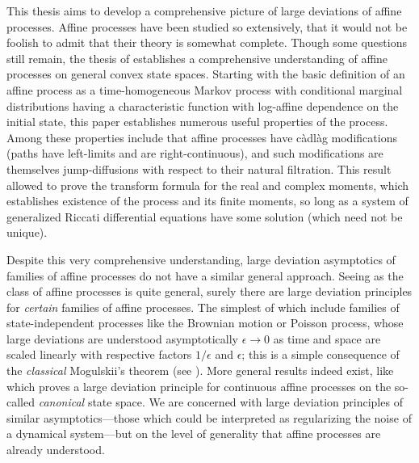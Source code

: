 This thesis aims to develop a comprehensive picture of large deviations of affine processes.
Affine processes have been studied so extensively, that it would not be foolish to admit that their theory is somewhat complete.
Though some questions still remain, the thesis of \cite{cuchiero2011} establishes a comprehensive understanding of affine processes on general convex state spaces.
Starting with the basic definition of an affine process as a time-homogeneous Markov process with conditional marginal distributions having a characteristic function with log-affine dependence on the initial state, this paper establishes numerous useful properties of the process.
Among these properties include that affine processes have c\`adl\`ag modifications (paths have left-limits and are right-continuous), and such modifications are themselves jump-diffusions with respect to their natural filtration.
This result allowed \cite{keller2015} to prove the transform formula for the real and complex moments, which establishes existence of the process and its finite moments, so long as a system of generalized Riccati differential equations have some solution (which need not be unique).

Despite this very comprehensive understanding, large deviation asymptotics of families of affine processes do not have a similar general approach.
Seeing as the class of affine processes is quite general, surely there are large deviation principles for \emph{certain} families of affine processes.
The simplest of which include families of state-independent processes like the Brownian motion or Poisson process, whose large deviations are understood asymptotically $\epsilon \rightarrow 0$ as time and space are scaled linearly with respective factors $1/\epsilon$ and $\epsilon$; this is a simple consequence of the \emph{classical} Mogulskii's theorem (see \cite{dembo2010}).
More general results indeed exist, like \cite{kang2014} which proves a large deviation principle for continuous affine processes on the so-called \emph{canonical} state space.
We are concerned with large deviation principles of similar asymptotics---those which could be interpreted as regularizing the noise of a dynamical system---but on the level of generality that affine processes are already understood.

